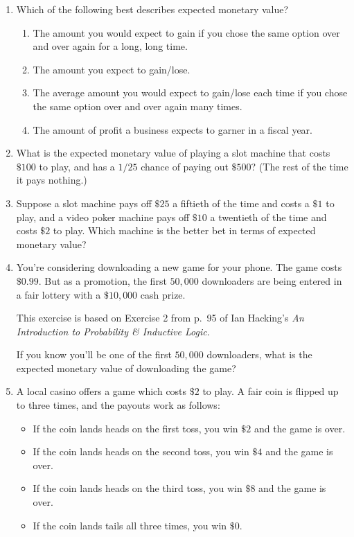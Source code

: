 \documentclass[justified]{tufte-book}
\providecommand{\tightlist}{%
  \setlength{\itemsep}{0pt}\setlength{\parskip}{0pt}}
\theoremstyle{definition}
\theoremstyle{definition}
\theoremstyle{definition}
\theoremstyle{remark}
\begin{document}
\begin{enumerate}
\item
  Which of the following best describes expected monetary value?

  \begin{enumerate}
  \def\labelenumii{\alph{enumii}.}
  \tightlist
  \item
    The amount you would expect to gain if you chose the same option
    over and over again for a long, long time.
  \item
    The amount you expect to gain/lose.
  \item
    The average amount you would expect to gain/lose each time if you
    chose the same option over and over again many times.
  \item
    The amount of profit a business expects to garner in a fiscal year.
  \end{enumerate}
\item
  What is the expected monetary value of playing a slot machine that
  costs \(\$100\) to play, and has a \(1/25\) chance of paying out
  \(\$500\)? (The rest of the time it pays nothing.)
\item
  Suppose a slot machine pays off \(\$25\) a fiftieth of the time and
  costs a \(\$1\) to play, and a video poker machine pays off \(\$10\) a
  twentieth of the time and costs \(\$2\) to play. Which machine is the
  better bet in terms of expected monetary value?
\item
  You're considering downloading a new game for your phone. The game
  costs \(\$0.99\). But as a promotion, the first \(50,000\) downloaders
  are being entered in a fair lottery with a \(\$10,000\) cash prize.

  \begin{marginfigure}
  This exercise is based on Exercise 2 from p.~95 of Ian Hacking's
  \emph{An Introduction to Probability \& Inductive Logic}.
  \end{marginfigure}

  If you know you'll be one of the first \(50,000\) downloaders, what is
  the expected monetary value of downloading the game?
\item
  A local casino offers a game which costs \(\$2\) to play. A fair coin
  is flipped up to three times, and the payouts work as follows:

  \begin{itemize}
  \tightlist
  \item
    If the coin lands heads on the first toss, you win \(\$2\) and the
    game is over.
  \item
    If the coin lands heads on the second toss, you win \(\$4\) and the
    game is over.
  \item
    If the coin lands heads on the third toss, you win \(\$8\) and the
    game is over.
  \item
    If the coin lands tails all three times, you win \(\$0\).
  \end{itemize}


\end{enumerate}
\end{document}
